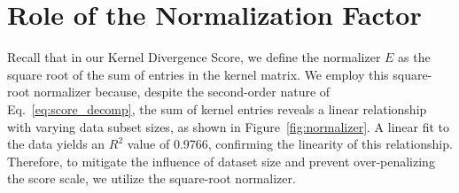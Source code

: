 \section{Role of the Normalization Factor}
\label{apdx:normalizer}
Recall that in our Kernel Divergence Score, we define the normalizer $E$ as the square root of the sum of entries in the kernel matrix.
We employ this square-root normalizer because, despite the second-order nature of Eq.~\eqref{eq:score_decomp}, the sum of kernel entries reveals a linear relationship with varying data subset sizes, as shown in Figure~\ref{fig:normalizer}.
A linear fit to the data yields an $R^2$ value of 0.9766, confirming the linearity of this relationship. 
Therefore, to mitigate the influence of dataset size and prevent over-penalizing the score scale, we utilize the square-root normalizer.

